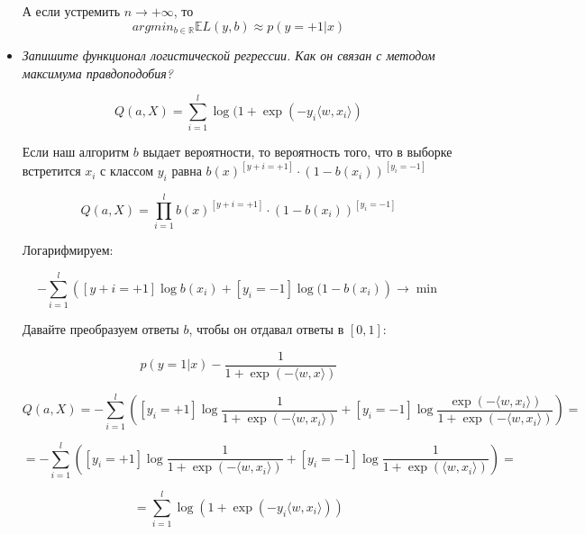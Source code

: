 \documentclass[a4paper]{article}
\begin{document}
\begin{itemize}
А если устремить $n \rightarrow +\infty$, то 
\[ argmin_{b \in \mathbb{R}} \mathbb{E} L(y, b) \approx p(y=+1|x) \]

\item \textit{Запишите функционал логистической регрессии. Как он связан с методом максимума
правдоподобия?}

\[ Q(a, X) =  \sum_{i=1}^l \log (1+\exp(-y_i \langle w, x_i \rangle )\]

Если наш алгоритм $b$ выдает вероятности, то вероятность того, что в выборке встретится $x_i$ с классом $y_i$ равна $b(x)^{[y+i = +1]}\cdot (1-b(x_i))^{[y_i=-1]}$

\[ Q(a, X) = \prod_{i=1}^l b(x)^{[y+i = +1]}\cdot (1-b(x_i))^{[y_i=-1]} \]

Логарифмируем:

\[ - \sum_{i=1}^l \left( [y+i = +1] \log b(x_i) + [y_i = -1] \log (1-b(x_i) \right) \rightarrow \min \]

Давайте преобразуем ответы $b$, чтобы он отдавал ответы в $[0,1]$:

\[ p(y=1|x) - \frac{1}{1+\exp(-\langle w, x \rangle)} \]

\[ Q(a, X) = - \sum_{i=1}^l \left( [y_i = +1] \log \frac{1}{1+\exp(-\langle w, x_i \rangle)} + [y_i = -1] \log \frac{\exp(-\langle w, x_i \rangle)}{1 + \exp(-\langle w, x_i \rangle)} \right) = \]

\[
= - \sum_{i=1}^l \left( [y_i = +1] \log \frac{1}{1+\exp(-\langle w, x_i \rangle)} + [y_i = -1] \log \frac{1}{1 + \exp(\langle w, x_i \rangle)} \right) = 
\]

\[ = \sum_{i=1}^l \log \left( 1+\exp(-y_i \langle w, x_i \rangle) \right) \]

\end{itemize}
\end{document}
